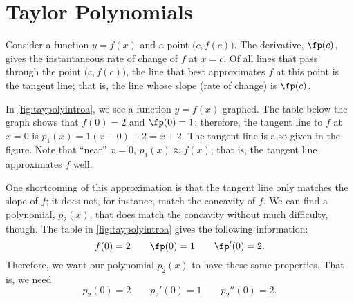 \section{Taylor Polynomials}\label{sec:taylor_poly}

Consider a function $y=f(x)$ and a point $\big(c,f(c)\big)$. The derivative, $\fp(c)$, gives the instantaneous rate of change of $f$ at $x=c$. Of all lines that pass through the point $\big(c,f(c)\big)$, the line that best approximates $f$ at this point is the tangent line; that is, the line whose slope (rate of change) is $\fp(c)$.


In \autoref{fig:taypolyintroa}, we see a function $y=f(x)$ graphed. The table below the graph shows that $f(0)=2$ and $\fp(0) = 1$; therefore, the tangent line to $f$ at $x=0$ is $p_1(x) = 1(x-0)+2 = x+2$. The tangent line is also given in the figure. Note that ``near'' $x=0$, $p_1(x) \approx f(x)$; that is, the tangent line approximates $f$ well.

One shortcoming of this approximation is that the tangent line only matches the slope of $f$; it does not, for instance, match the concavity of $f$. We can find a polynomial, $p_2(x)$, that does match the concavity without much difficulty, though. The table in \autoref{fig:taypolyintroa} gives the following information:
\[f(0) = 2 \qquad \fp(0) = 1\qquad \fp'(0) = 2.\]
Therefore, we want our polynomial $p_2(x)$ to have these same properties. That is, we need
\[p_2(0) = 2 \qquad p_2'(0) = 1 \qquad p_2''(0) = 2.\]

